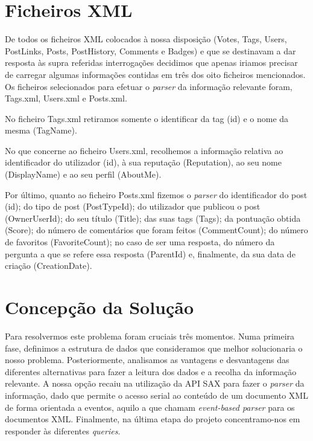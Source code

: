 \documentclass[a4paper]{report}
\begin{document}
\section{Ficheiros XML}
\label{sec:xml}

De todos os ficheiros XML colocados à nossa disposição (Votes, Tags, Users,
PostLinks, Posts, PostHistory, Comments e Badges) e que se destinavam a dar resposta
às supra referidas interrogações decidimos que apenas iriamos precisar de carregar
algumas informações contidas em três dos oito ficheiros mencionados.
Os ficheiros selecionados para efetuar o \textit{parser} da informação relevante
foram, Tags.xml, Users.xml e Posts.xml. \par
No ficheiro Tags.xml retiramos somente o identificar da tag (id) e o nome da mesma
(TagName). \par
No que concerne ao ficheiro Users.xml, recolhemos a informação relativa ao identificador
do utilizador (id), à sua reputação (Reputation), ao seu nome (DisplayName) e ao seu
perfil (AboutMe). \par
Por último, quanto ao ficheiro Posts.xml fizemos o \textit{parser} do identificador
do post (id); do tipo de post (PostTypeId); do utilizador que publicou o post
(OwnerUserId); do seu título (Title); das suas tags (Tags); da pontuação obtida
(Score); do número de comentários que foram feitos (CommentCount); do número de
favoritos (FavoriteCount); no caso de ser uma resposta, do número da pergunta a
que se refere essa resposta (ParentId) e, finalmente, da sua data de criação
(CreationDate).

\section{Concepção da Solução}
\label{sec:solucao}

Para resolvermos este problema foram cruciais três momentos. Numa primeira fase,
definimos a estrutura de dados que consideramos que melhor solucionaria o nosso
problema. Posteriormente, analisamos as vantagens e desvantagens das diferentes
alternativas para fazer a leitura dos dados e a recolha da informação relevante.
A nossa opção recaiu na utilização da API SAX para fazer o \textit{parser} da
informação, dado que permite o acesso serial ao conteúdo de um documento XML de
forma orientada a eventos, aquilo a que chamam \textit{event-based parser} para
os documentos XML.
Finalmente, na última etapa do projeto concentramo-nos em responder
às diferentes \textit{queries}.
\end{document}

